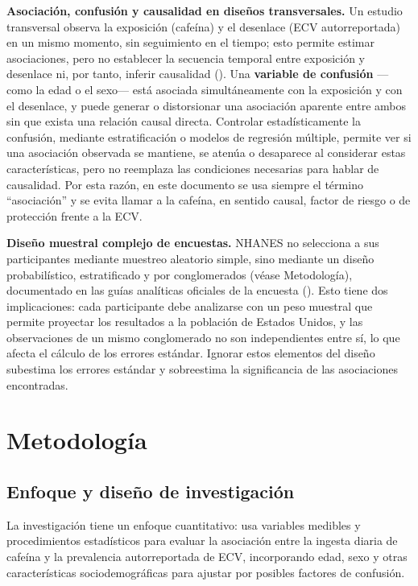 \documentclass[
  spanish,
  12pt,
]{article}
\begin{document}
\textbf{Asociación, confusión y causalidad en diseños transversales.} Un
estudio transversal observa la exposición (cafeína) y el desenlace
(ECV autorreportada) en un mismo momento, sin seguimiento en el tiempo;
esto permite estimar asociaciones, pero no establecer la secuencia
temporal entre exposición y desenlace ni, por tanto, inferir
causalidad (). Una \textbf{variable de confusión} ---como la
edad o el sexo--- está asociada simultáneamente con la exposición y con
el desenlace, y puede generar o distorsionar una asociación aparente
entre ambos sin que exista una relación causal directa. Controlar
estadísticamente la confusión, mediante estratificación o modelos de
regresión múltiple, permite ver si una asociación observada se
mantiene, se atenúa o desaparece al considerar estas características,
pero no reemplaza las condiciones necesarias para hablar de causalidad.
Por esta razón, en este documento se usa siempre el término
``asociación'' y se evita llamar a la cafeína, en sentido causal, factor
de riesgo o de protección frente a la ECV.

\textbf{Diseño muestral complejo de encuestas.} NHANES no selecciona a sus
participantes mediante muestreo aleatorio simple, sino mediante un
diseño probabilístico, estratificado y por conglomerados (véase
Metodología), documentado en las guías analíticas oficiales de la
encuesta (). Esto tiene dos implicaciones: cada
participante debe analizarse con un peso muestral que permite proyectar
los resultados a la población de Estados Unidos, y las observaciones de
un mismo conglomerado no son independientes entre sí, lo que afecta el
cálculo de los errores estándar. Ignorar estos elementos del diseño
subestima los errores estándar y sobreestima la significancia de las
asociaciones encontradas.

\section{Metodología}\label{metodologuxeda}

\subsection{Enfoque y diseño de investigación}\label{enfoque-y-diseuxf1o-de-investigaciuxf3n}

La investigación tiene un enfoque cuantitativo: usa variables medibles
y procedimientos estadísticos para evaluar la asociación entre la
ingesta diaria de cafeína y la prevalencia autorreportada de ECV,
incorporando edad, sexo y otras características sociodemográficas para
ajustar por posibles factores de confusión.
\end{document}
